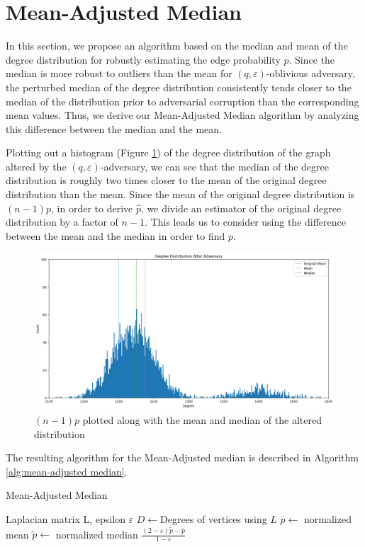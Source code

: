 \documentclass[10pt,onecolumn,letterpaper]{article}
\newcommand{\eps}{\varepsilon}
\let\epsilon\varepsilon
\begin{document}
\section{Mean-Adjusted Median}
In this section, we propose an algorithm based on the median and mean of the degree distribution for robustly estimating the edge probability $p$. Since the median is more robust to outliers than the mean for $(q,\eps)$-oblivious adversary, the perturbed median of the degree distribution consistently tends closer to the median of the distribution prior to adversarial corruption than the corresponding mean values. Thus, we derive our Mean-Adjusted Median algorithm by analyzing this difference between the median and the mean.

Plotting out a histogram (Figure \ref{fig:mean-vs-median}) of the degree distribution of the graph altered by the \((q,\eps)\)-adversary, we can see that the median of the degree distribution is roughly two times closer to the mean of the original degree distribution than the mean. Since the mean of the original degree distribution is \((n-1)p\), in order to derive $\hat{p}$, we divide an estimator of the original degree distribution by a factor of \(n-1\). This leads us to consider using the difference between the mean and the median in order to find \(p\).

\begin{figure}[hb]
    \centering
    \includegraphics[height=0.35\linewidth]{img/MAM_intuit.png}
    \caption{\((n-1)p\) plotted along with the mean and median of the altered distribution}
    \label{fig:mean-vs-median}
\end{figure}

The resulting algorithm for the Mean-Adjusted median is described in Algorithm \ref{alg:mean-adjusted median}.

\begin{algorithm}
\caption{Mean-Adjusted Median}\label{alg:mean-adjusted median}
\begin{algorithmic}
\Require Laplacian matrix L, epsilon $\epsilon$
\State $D \gets $Degrees of vertices using $L$
\State $\bar{p} \gets $ normalized mean 
\State $\tilde{p} \gets$ normalized median
\State \Return $\frac{(2-\epsilon)\tilde{p} - \bar{p}}{1-\epsilon}$
\end{algorithmic}
\end{algorithm}
\end{document}
